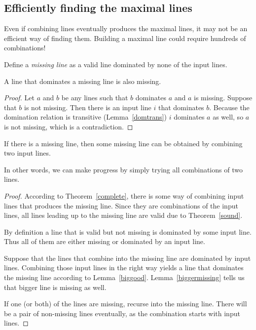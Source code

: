 \documentclass[english, 12pt, a4paper, sci, a-1b, online]{aaltothesis}
\begin{document}
\subsection{Efficiently finding the maximal lines}

Even if combining lines eventually produces the maximal lines, it may not be an efficient way of finding them. Building a maximal line could require hundreds of combinations!

Define a \emph{missing line} as a valid line dominated by none of the input lines.

\begin{lemma}\label{biggermissing}
A line that dominates a missing line is also missing.
\end{lemma}

\begin{proof}
Let $a$ and $b$ be any lines such that $b$ dominates $a$ and $a$ is missing. Suppose that $b$ is not missing. Then there is an input line $i$ that dominates $b$. Because the domination relation is transitive (Lemma~\ref{domtrans}) $i$ dominates $a$ as well, so $a$ is not missing, which is a contradiction.
\end{proof}

\begin{theorem}\label{justtwo}
If there is a missing line, then some missing line can be obtained by combining two input lines.
\end{theorem}

In other words, we can make progress by simply trying all combinations of two lines.

\begin{proof}
According to Theorem~\ref{complete}, there is some way of combining input lines that produces the missing line. Since they are combinations of the input lines, all lines leading up to the missing line are valid due to Theorem~\ref{sound}.

By definition a line that is valid but not missing is dominated by some input line. Thus all of them are either missing or dominated by an input line.

Suppose that the lines that combine into the missing line are dominated by input lines. Combining those input lines in the right way yields a line that dominates the missing line according to Lemma~\ref{biggood}. Lemma~\ref{biggermissing} tells us that bigger line is missing as well.

If one (or both) of the lines are missing, recurse into the missing line. There will be a pair of non-missing lines eventually, as the combination starts with input lines.
\end{proof}
\end{document}
